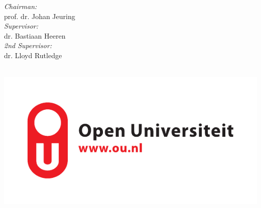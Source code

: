 \begin{titlepage}
\begin{center}
\begin{minipage}{0.49\textwidth}
\begin{flushleft}
\end{flushleft}
\end{minipage}
\begin{minipage}{0.45\textwidth}
\begin{flushright} \large
\emph{Chairman:} \\
prof. dr. Johan Jeuring \\%
\emph{Supervisor:} \\
dr. Bastiaan Heeren\\ %
\emph{2nd Supervisor:}\\
dr. Lloyd Rutledge
\end{flushright}
\end{minipage}\\[0.5cm]



\includegraphics[scale=0.8]{OU_text_logo.pdf}
\end{center}


 


\end{titlepage}
